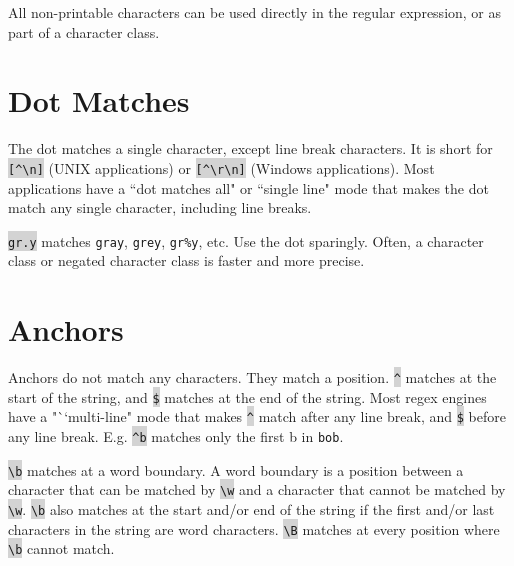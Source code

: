 All non-printable characters can be used directly in the regular expression, or as part of a character class.



\chapter{Dot Matches}

The dot matches a single character, except line break characters. It is short for \colorbox{lightgray}{\texttt{[\^{}\textbackslash n]}} (UNIX applications) or \colorbox{lightgray}{\texttt{[\^{}\textbackslash r\textbackslash n]}} (Windows applications). Most applications have a ``dot matches all" or ``single line" mode that makes the dot match any single character, including line breaks.

\colorbox{lightgray}{\texttt{gr.y}} matches \texttt{gray}, \texttt{grey}, \texttt{gr\%y}, etc. Use the dot sparingly. Often, a character class or negated character class is faster and more precise.



\chapter{Anchors}


Anchors do not match any characters. They match a position. \colorbox{lightgray}{\texttt{\^{}}} matches at the start of the string, and \colorbox{lightgray}{\texttt{\$}} matches at the end of the string. Most regex engines have a "``multi-line" mode that makes \colorbox{lightgray}{\texttt{\^{}}} match after any line break, and \colorbox{lightgray}{\texttt{\$}} before any line break. E.g. \colorbox{lightgray}{\texttt{\^{}b}} matches only the first b in \texttt{bob}.


\colorbox{lightgray}{\texttt{\textbackslash b}} matches at a word boundary. A word boundary is a position between a character that can be matched by \colorbox{lightgray}{\texttt{\textbackslash w}} and a character that cannot be matched by \colorbox{lightgray}{\texttt{\textbackslash w}}. \colorbox{lightgray}{\texttt{\textbackslash b}} also matches at the start and/or end of the string if the first and/or last characters in the string are word characters. \colorbox{lightgray}{\texttt{\textbackslash B}} matches at every position where \colorbox{lightgray}{\texttt{\textbackslash b}} cannot match.




